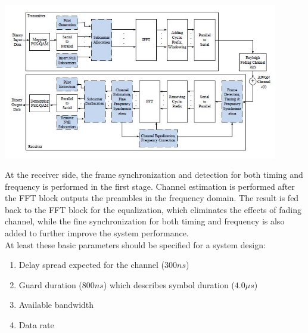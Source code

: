 \begin{center}
\includegraphics[width=12cm]{content/fig/ieee_system_design.JPG}
\end{center}

At the receiver side, the frame synchronization and detection for both timing and frequency is performed in the first stage. Channel estimation is performed after the FFT block outputs the preambles in the frequency domain. The result is fed back to the FFT block for the equalization, which eliminates the effects of fading channel, while the fine synchronization for both timing and frequency is also added to further improve the system performance.\\
At least these basic parameters should be specified for a system design:

\begin{enumerate}
  \item Delay spread expected for the channel ($300 ns$)
  \item Guard duration ($800 ns$) which describes symbol duration ($4.0 \mu s$)
  \item Available bandwidth
  \item Data rate
\end{enumerate}

